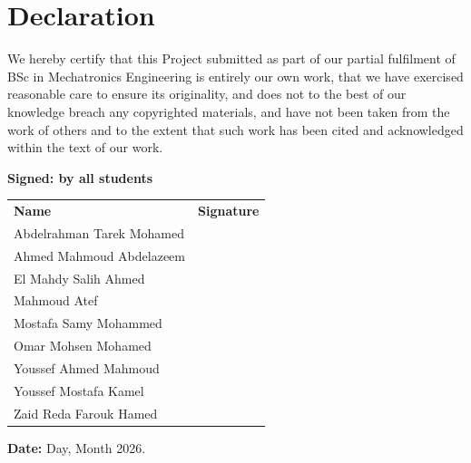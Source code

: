 
\chapter*{Declaration}

We hereby certify that this Project submitted as part of our partial fulfilment of BSc in Mechatronics Engineering is entirely our own work, that we have exercised reasonable care to ensure its originality, and does not to the best of our knowledge breach any copyrighted materials, and have not been taken from the work of others and to the extent that such work has been cited and acknowledged within the text of our work.

\vspace{0.8cm}

\textbf{Signed: by all students}

\vspace{0.5cm}

\renewcommand{\arraystretch}{1.1}
\begin{tabular}{p{7cm} p{4cm}}
\textbf{Name} & \textbf{Signature} \\[0.4cm]
Abdelrahman Tarek Mohamed & \hrulefill \\[0.4cm]
Ahmed Mahmoud Abdelazeem & \hrulefill \\[0.4cm]
El Mahdy Salih Ahmed & \hrulefill \\[0.4cm]
Mahmoud Atef & \hrulefill \\[0.4cm]
Mostafa Samy Mohammed & \hrulefill \\[0.4cm]
Omar Mohsen Mohamed  & \hrulefill \\[0.4cm]
Youssef Ahmed Mahmoud& \hrulefill \\[0.4cm]
Youssef Mostafa Kamel& \hrulefill \\[0.4cm]
Zaid Reda Farouk Hamed & \hrulefill \\[0.4cm]
\end{tabular}

\vspace{0.8cm}

\textbf{Date:} Day, \underline{\hspace{2cm}} Month 2026.
